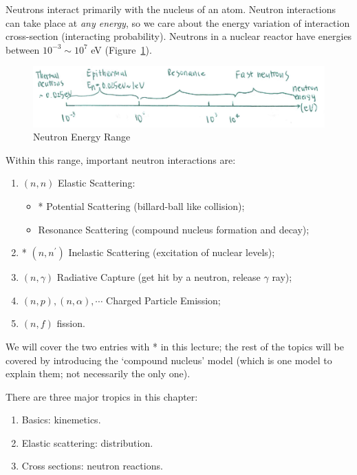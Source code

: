 \documentclass{school-22.101-notes}
\date{November 28, 2011}
\begin{document}
\maketitle

Neutrons interact primarily with the nucleus of an atom. Neutron interactions can take place at \textit{any energy}, so we care about the energy variation of interaction cross-section (interacting probability). Neutrons in a nuclear reactor have energies between $10^{-3} \sim 10^7$ eV (Figure~\ref{neutron-energy}).  
\begin{figure}[ht]
    \centering
    \includegraphics[width=5in]{images/ni/neutron-energy.png}
    \caption{Neutron Energy Range\label{neutron-energy}}
\end{figure}
Within this range, important neutron interactions are: 
\begin{enumerate}
\item $(n,n)$ Elastic Scattering: 
    \begin{itemize}
    \item* Potential Scattering (billard-ball like collision);
    \item Resonance Scattering (compound nucleus formation and decay);
    \end{itemize}
\item* $(n,n^{\prime})$ Inelastic Scattering (excitation of nuclear levels);
\item $(n, \gamma)$ Radiative Capture (get hit by a neutron, release $\gamma$ ray);
\item $(n, p), (n,\alpha), \cdots$ Charged Particle Emission;
\item $(n, f)$ fission.     
\end{enumerate}
We will cover the two entries with * in this lecture; the rest of the topics will be covered by introducing the `compound nucleus' model (which is one model to explain them; not necessarily the only one). 


There are three major tropics in this chapter: 
\begin{enumerate}
\item Basics: kinemetics. 
\item Elastic scattering: distribution. 
\item Cross sections: neutron reactions. 
\end{enumerate}
\end{document}

